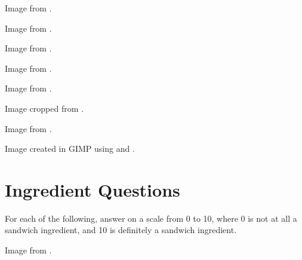 	\begin{minipage}{\textwidth}
		Image from \cite{toastSandwich}.
	\end{minipage}

	\begin{minipage}{\textwidth}
		Image from \cite{oreo}.
	\end{minipage}

	\begin{minipage}{\textwidth}
		Image from \cite{ritzCracker}.
	\end{minipage}

	\begin{minipage}{\textwidth}
		Image from \cite{sushiBurrito}.
	\end{minipage}

	\begin{minipage}{\textwidth}
		Image from \cite{nigiri}.
	\end{minipage}

	\begin{minipage}{\textwidth}
		Image cropped from \cite{cheese}.
	\end{minipage}

	\begin{minipage}{\textwidth}
		Image from \cite{salad}.
	\end{minipage}

	\begin{minipage}{\textwidth}
		Image created in GIMP using \cite{breadSlices} and \cite{brick}.
	\end{minipage}

\section{Ingredient Questions}
	For each of the following, answer on a scale from 0 to 10, where 0 is not at all a sandwich ingredient, and 10 is definitely a sandwich ingredient.

	\begin{minipage}{\textwidth}
		Image from \cite{coldCuts}.
	\end{minipage}

